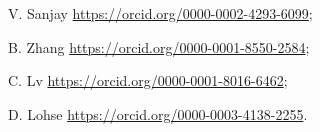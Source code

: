 \documentclass{jfm}
\begin{document}

V. Sanjay \href{https://orcid.org/0000-0002-4293-6099}{https://orcid.org/0000-0002-4293-6099}; 

B. Zhang \href{https://orcid.org/0000-0001-8550-2584}{https://orcid.org/0000-0001-8550-2584};

C. Lv \href{https://orcid.org/0000-0001-8016-6462}{https://orcid.org/0000-0001-8016-6462};

D. Lohse \href{https://orcid.org/0000-0003-4138-2255}{https://orcid.org/0000-0003-4138-2255}. \\




\end{document}
